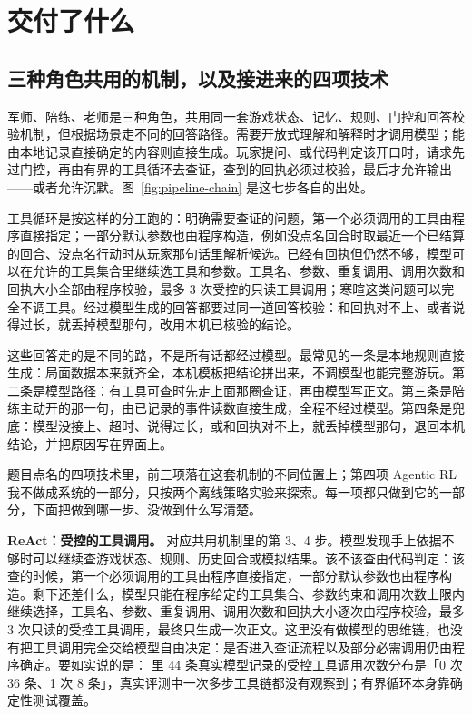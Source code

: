 \section{交付了什么}

\subsection{三种角色共用的机制，以及接进来的四项技术}

军师、陪练、老师是三种角色，共用同一套游戏状态、记忆、规则、门控和回答校验机制，但根据场景走不同的回答路径。需要开放式理解和解释时才调用模型；能由本地记录直接确定的内容则直接生成。玩家提问、或代码判定该开口时，请求先过门控，再由有界的工具循环去查证，查到的回执必须过校验，最后才允许输出——或者允许沉默。图~\ref{fig:pipeline-chain} 是这七步各自的出处。



工具循环是按这样的分工跑的：明确需要查证的问题，第一个必须调用的工具由程序直接指定；一部分默认参数也由程序构造，例如没点名回合时取最近一个已结算的回合、没点名行动时从玩家那句话里解析候选。已经有回执但仍然不够，模型可以在允许的工具集合里继续选工具和参数。工具名、参数、重复调用、调用次数和回执大小全部由程序校验，最多 3 次受控的只读工具调用；寒暄这类问题可以完全不调工具。经过模型生成的回答都要过同一道回答校验：和回执对不上、或者说得过长，就丢掉模型那句，改用本机已核验的结论。

这些回答走的是不同的路，不是所有话都经过模型。最常见的一条是本地规则直接生成：局面数据本来就齐全，本机模板把结论拼出来，不调模型也能完整游玩。第二条是模型路径：有工具可查时先走上面那圈查证，再由模型写正文。第三条是陪练主动开的那一句，由已记录的事件读数直接生成，全程不经过模型。第四条是兜底：模型没接上、超时、说得过长，或和回执对不上，就丢掉模型那句，退回本机结论，并把原因写在界面上。

题目点名的四项技术里，前三项落在这套机制的不同位置上；第四项 Agentic RL 我不做成系统的一部分，只按两个离线策略实验来探索。每一项都只做到它的一部分，下面把做到哪一步、没做到什么写清楚。

\textbf{ReAct：受控的工具调用。} 对应共用机制里的第 3、4 步。模型发现手上依据不够时可以继续查游戏状态、规则、历史回合或模拟结果。该不该查由代码判定：该查的时候，第一个必须调用的工具由程序直接指定，一部分默认参数也由程序构造。剩下还差什么，模型只能在程序给定的工具集合、参数约束和调用次数上限内继续选择，工具名、参数、重复调用、调用次数和回执大小逐次由程序校验，最多 3 次只读的受控工具调用，最终只生成一次正文。这里没有做模型的思维链，也没有把工具调用完全交给模型自由决定：是否进入查证流程以及部分必需调用仍由程序确定。要如实说的是： 里 44 条真实模型记录的受控工具调用次数分布是「0 次 36 条、1 次 8 条」，真实评测中一次多步工具链都没有观察到；有界循环本身靠确定性测试覆盖。

